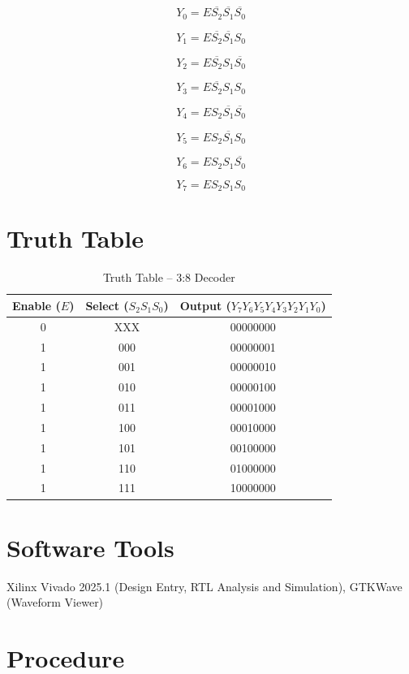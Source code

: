 \documentclass[12pt,a4paper]{report}
\begin{document}
\[
Y_0 = E\overline{S_2}\overline{S_1}\overline{S_0}
\]

\[
Y_1 = E\overline{S_2}\overline{S_1}S_0
\]

\[
Y_2 = E\overline{S_2}S_1\overline{S_0}
\]

\[
Y_3 = E\overline{S_2}S_1S_0
\]

\[
Y_4 = ES_2\overline{S_1}\overline{S_0}
\]

\[
Y_5 = ES_2\overline{S_1}S_0
\]

\[
Y_6 = ES_2S_1\overline{S_0}
\]

\[
Y_7 = ES_2S_1S_0
\]

\section{Truth Table}

\begin{table}[H]
    \centering
    \caption{Truth Table -- 3:8 Decoder}
    \begin{tabular}{|c|c|c|}
        \hline
        \textbf{Enable ($E$)} & \textbf{Select ($S_2S_1S_0$)} & \textbf{Output ($Y_7Y_6Y_5Y_4Y_3Y_2Y_1Y_0$)} \\
        \hline
        0 & XXX & 00000000 \\
        \hline
        1 & 000 & 00000001 \\
        1 & 001 & 00000010 \\
        1 & 010 & 00000100 \\
        1 & 011 & 00001000 \\
        1 & 100 & 00010000 \\
        1 & 101 & 00100000 \\
        1 & 110 & 01000000 \\
        1 & 111 & 10000000 \\
        \hline
    \end{tabular}
\end{table}

\vspace{0.5cm}

\section{Software Tools}

Xilinx Vivado 2025.1 (Design Entry, RTL Analysis and Simulation), GTKWave (Waveform Viewer)

\section{Procedure}
\end{document}

